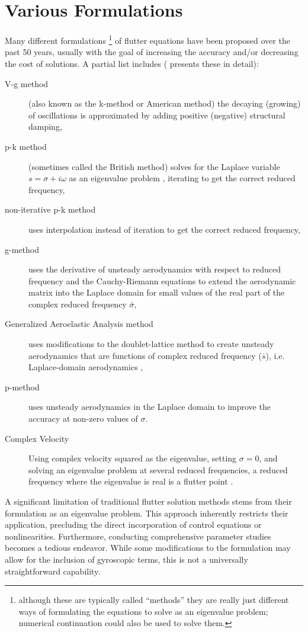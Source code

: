 \documentclass[10pt,openany,twoside]{book}
\numberwithin{equation}{section}   %
\begin{document}
\section{Various Formulations}\label{sect:formulations}
Many different formulations
\footnote{although these are typically called ``methods'' they are really
	just different ways of formulating the equations to solve as an
	eigenvalue problem; numerical continuation could also be used to solve them.}
of flutter equations have been proposed
over the past 50 years, usually with the goal of increasing the accuracy
and/or decreasing the cost of solutions. A partial list includes
(\cite{demasi2024introduction} presents these in detail):
\begin{description}
	\item[V-g method] (also known as the k-method or American method)
		\cite{hassig1971approximate} the decaying (growing)
		of oscillations is approximated by adding positive (negative) structural
		damping, 
	\item[p-k method] (sometimes called the British method) solves for
		the Laplace variable $s = \sigma + i\omega$ as an eigenvalue problem
		\cite{hassig1971approximate}, iterating to get the correct reduced frequency,
	\item[non-iterative p-k method]\cite{pitt1999new} uses interpolation instead of
		iteration to get the correct reduced frequency,
	\item[g-method]  uses the derivative of unsteady aerodynamics with respect to
			reduced frequency and the Cauchy-Riemann equations to extend the
			aerodynamic matrix into the Laplace domain for small values of the real
			part of the complex reduced frequency $\bar{\sigma}$\cite{chen2000damping},
	\item[Generalized Aeroelastic Analysis method] uses modifications to the
			doublet-lattice method to create unsteady aerodynamics that are functions
			of complex reduced frequency ($\bar{s}$), i.e. Laplace-domain aerodynamics
			\cite{edwards2008flutter},
	\item[p-method] uses unsteady aerodynamics in the Laplace domain
			to improve the accuracy at non-zero values of $\sigma$.
			\cite{haddadpour2009true}
	\item[Complex Velocity] Using complex velocity squared as the eigenvalue,
		setting $\sigma=0$, and solving an eigenvalue problem at several
		reduced frequencies, a reduced frequency where the eigenvalue is
		real is a flutter point \cite{pitt2000complex}.
\end{description}
A significant limitation of traditional flutter solution methods stems
from their formulation as an eigenvalue problem. This approach inherently
restricts their application, precluding the direct incorporation of
control equations or nonlinearities. Furthermore, conducting comprehensive
parameter studies becomes a tedious endeavor. While some modifications
to the formulation may allow for the inclusion of gyroscopic terms,
this is not a universally straightforward capability.
\end{document}
